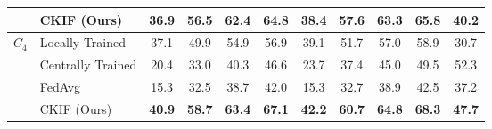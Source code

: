 \begin{table}[b]
\begin{tabular}{llcccc|cccc|c}
                   & CKIF (Ours)     & \textbf{36.9} & \textbf{56.5} & \textbf{62.4} & \textbf{64.8} & \textbf{38.4} & \textbf{57.6} & \textbf{63.3} & \textbf{65.8} & \textbf{40.2}  \\
    \midrule
    $C_4$ & Locally Trained   & 37.1 & 49.9 & 54.9 & 56.9 & 39.1 & 51.7 & 57.0 & 58.9 & 30.7  \\
                   & Centrally Trained & 20.4 & 33.0 & 40.3 & 46.6 & 23.7 & 37.4 & 45.0 & 49.5 & 52.3  \\
                   & FedAvg   & 15.3 & 32.5 & 38.7 & 42.0 & 15.3 & 32.7 & 38.9 & 42.5  & 37.2 \\
                   & CKIF (Ours)     & \textbf{40.9} & \textbf{58.7} & \textbf{63.4} & \textbf{67.1} & \textbf{42.2} & \textbf{60.7} & \textbf{64.8} & \textbf{68.3} & \textbf{47.7}  \\
    \midrule


\end{tabular}
\end{table}
